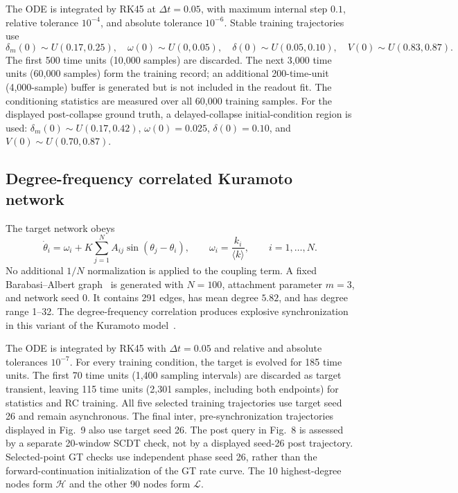 \documentclass[10pt,a4paper]{article}
\begin{document}
The ODE is integrated by RK45 at $\Delta t=0.05$, with maximum internal step
$0.1$, relative tolerance $10^{-4}$, and absolute tolerance $10^{-6}$. Stable
training trajectories use
\begin{equation}
  \delta_m(0)\sim U(0.17,0.25),\quad
  \omega(0)\sim U(0,0.05),\quad
  \delta(0)\sim U(0.05,0.10),\quad
  V(0)\sim U(0.83,0.87).
\end{equation}
The first 500 time units (10,000 samples) are discarded. The next 3,000 time
units (60,000 samples) form the training record; an additional 200-time-unit
(4,000-sample) buffer is generated but is not included in the readout fit. The
conditioning statistics are measured over all 60,000 training samples. For the
displayed post-collapse ground truth, a delayed-collapse initial-condition
region is used:
$\delta_m(0)\sim U(0.17,0.42)$, $\omega(0)=0.025$,
$\delta(0)=0.10$, and $V(0)\sim U(0.70,0.87)$.

\subsection{Degree-frequency correlated Kuramoto network}

The target network obeys
\begin{equation}
  \dot\theta_i=\omega_i+K\sum_{j=1}^{N}A_{ij}
  \sin(\theta_j-\theta_i),\qquad
  \omega_i=\frac{k_i}{\langle k\rangle},
  \qquad i=1,\ldots,N.
  \label{eq:kuramoto}
\end{equation}
No additional $1/N$ normalization is applied to the coupling term. A fixed
Barabasi--Albert graph~\cite{Barabasi1999} is generated with $N=100$,
attachment parameter $m=3$, and network seed 0. It contains 291 edges, has mean
degree $5.82$, and has degree range 1--32. The degree-frequency correlation
produces explosive synchronization in this variant of the Kuramoto
model~\cite{Kuramoto1984,GomezGardenes2011}.

The ODE is integrated by RK45 with $\Delta t=0.05$ and relative and absolute
tolerances $10^{-7}$. For every training condition, the target is evolved for
185 time units. The first 70 time units (1,400 sampling intervals) are discarded
as target transient, leaving 115 time units (2,301 samples, including both
endpoints) for statistics and RC training. All five selected training
trajectories use target seed 26 and remain asynchronous. The final inter,
pre-synchronization trajectories displayed in Fig.~9 also use target seed 26.
The post query in Fig.~8 is assessed by a separate 20-window SCDT check, not
by a displayed seed-26 post trajectory. Selected-point GT checks use independent
phase seed 26, rather than the forward-continuation initialization of the GT rate curve.
The 10 highest-degree nodes form
$\mathcal H$ and the other 90
nodes form $\mathcal L$.
\end{document}
